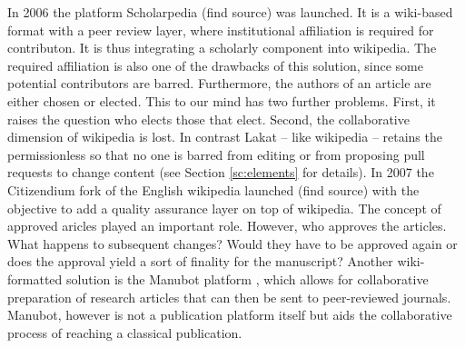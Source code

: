 \documentclass[14pt]{article}
\newcommand{\remark}[1]{{\color{purple} (#1)}}
\begin{document}
In 2006 the platform Scholarpedia \cite{}\remark{find source} was launched. It is a wiki-based format with a peer review layer, where institutional affiliation is required for contributon. It is thus integrating a scholarly component into wikipedia. The required affiliation is also one of the drawbacks of this solution, since some potential contributors are barred. Furthermore, the authors of an article are either chosen or elected. This to our mind has two further problems. First, it raises the question who elects those that elect. Second, the collaborative dimension of wikipedia is lost. In contrast Lakat -- like wikipedia -- retains the permissionless so that no one is barred from editing or from proposing pull requests to change content (see Section \ref{sc:elements} for details). In 2007 the Citizendium fork of the English wikipedia launched \cite{} \remark{find source} with the objective to add a quality assurance layer on top of wikipedia. The concept of approved aricles played an important role. However, who approves the articles. What happens to subsequent changes? Would they have to be approved again or does the approval yield a sort of finality for the manuscript?
Another wiki-formatted solution is the Manubot platform \cite{himmelstein2019open}, which allows for collaborative preparation of research articles that can then be sent to peer-reviewed journals. Manubot, however is not a publication platform itself but aids the collaborative process of reaching a classical publication. 
\end{document}
